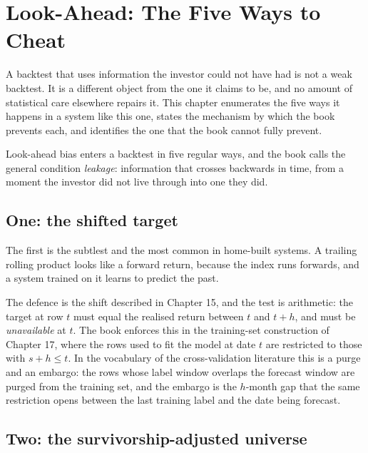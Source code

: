 
\chapter{Look-Ahead: The Five Ways to Cheat}
\label{ch:look-ahead}

A backtest that uses information the investor could not have had is not a
weak backtest. It is a different object from the one it claims to be, and
no amount of statistical care elsewhere repairs it. This chapter enumerates
the five ways it happens in a system like this one, states the mechanism
by which the book prevents each, and identifies the one that the book
cannot fully prevent.

Look-ahead bias enters a backtest in five regular ways, and the book calls
the general condition \emph{leakage}: information that crosses backwards in
time, from a moment the investor did not live through into one they did.

\section{One: the shifted target}

The first is the subtlest and the most common in home-built systems. A
trailing rolling product looks like a forward return, because the index
runs forwards, and a system trained on it learns to predict the past.

The defence is the shift described in Chapter 15, and the test is
arithmetic: the target at row \(t\) must equal the realised return between
\(t\) and \(t+h\), and must be \emph{unavailable} at \(t\). The book
enforces this in the training-set construction of Chapter 17, where the
rows used to fit the model at date \(t\) are restricted to those with
\(s + h \le t\). In the vocabulary of the cross-validation literature this
is a purge and an embargo: the rows whose label window overlaps the
forecast window are purged from the training set, and the embargo is the
\(h\)-month gap that the same restriction opens between the last training
label and the date being forecast.

\section{Two: the survivorship-adjusted universe}

